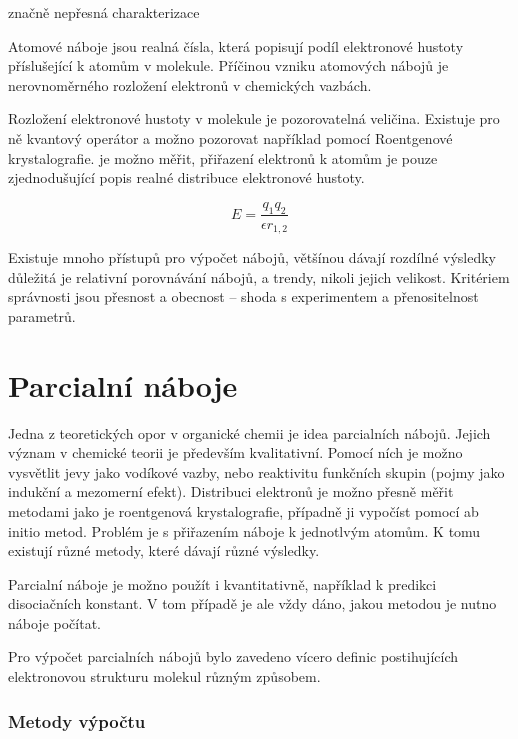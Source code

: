 \documentclass[11pt,draft,oneside]{fithesis2}
\begin{document}
značně nepřesná charakterizace

Atomové náboje jsou realná čísla, která popisují podíl elektronové hustoty příslušející k atomům v molekule. Příčinou vzniku atomových nábojů je nerovnoměrného rozložení elektronů v chemických vazbách. 



Rozložení elektronové hustoty v molekule je pozorovatelná veličina. Existuje pro ně kvantový operátor a možno pozorovat například pomocí Roentgenové krystalografie. je možno měřit, přiřazení elektronů k atomům je pouze zjednodušující popis realné distribuce elektronové hustoty.


$$E=\frac{q_1 q_2}{\epsilon r_{1,2}}$$


Existuje mnoho přístupů pro výpočet nábojů, většínou dávají rozdílné výsledky důležitá je relativní porovnávání nábojů, a trendy, nikoli jejich velikost. Kritériem správnosti jsou přesnost a obecnost – shoda s experimentem a přenositelnost parametrů.

\chapter{Parcialní náboje}

Jedna z teoretických opor v organické chemii je idea parcialních nábojů. Jejich význam v chemické teorii je především kvalitativní. Pomocí ních je možno vysvětlit jevy jako vodíkové vazby, nebo reaktivitu funkčních skupin (pojmy jako indukční a mezomerní efekt). Distribuci elektronů je možno přesně měřit metodami jako je roentgenová krystalografie, případně ji vypočíst pomocí ab initio metod. Problém je s přiřazením náboje k jednotlvým atomům. K tomu existují různé metody, které dávají různé výsledky.

Parcialní náboje je možno použít i kvantitativně, například k predikci disociačních konstant. V tom případě je ale vždy dáno, jakou metodou je nutno náboje počítat.

Pro výpočet parcialních nábojů bylo zavedeno vícero definic postihujících elektronovou strukturu molekul různým způsobem.

\subsection{Metody výpočtu}
\end{document}

